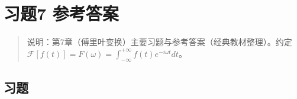 \chapter{习题7 参考答案}\label{ux4e60ux98987-ux53c2ux8003ux7b54ux6848}

\begin{quote}
说明：第7章（傅里叶变换）主要习题与参考答案（经典教材整理）。约定
\(\mathcal F[f(t)]=F(\omega)=\int_{-\infty}^{+\infty}f(t)e^{-i\omega t}dt\)。
\end{quote}

\section{习题}\label{ux4e60ux9898-6}

